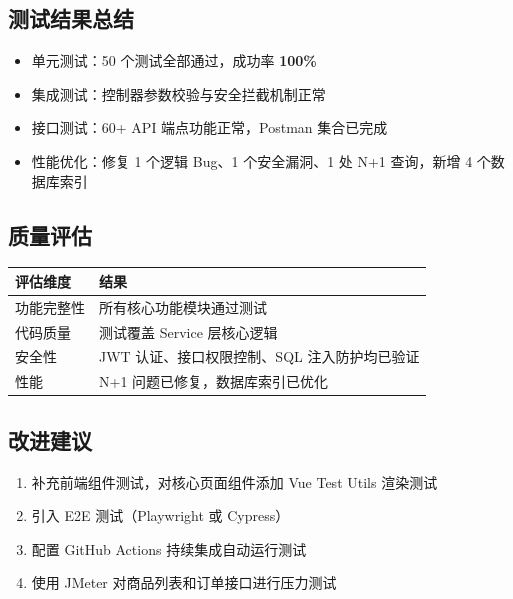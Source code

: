 \documentclass[12pt,a4paper,UTF8]{ctexart}
\begin{document}
\subsection{测试结果总结}
\begin{itemize}
    \item 单元测试：50 个测试全部通过，成功率 \textbf{100\%}
    \item 集成测试：控制器参数校验与安全拦截机制正常
    \item 接口测试：60+ API 端点功能正常，Postman 集合已完成
    \item 性能优化：修复 1 个逻辑 Bug、1 个安全漏洞、1 处 N+1 查询，新增 4 个数据库索引
\end{itemize}

\subsection{质量评估}

\begin{table}[H]
\centering
\begin{tabularx}{\textwidth}{lX}
\toprule
\textbf{评估维度} & \textbf{结果} \\
\midrule
功能完整性 & 所有核心功能模块通过测试 \\
代码质量 & 测试覆盖 Service 层核心逻辑 \\
安全性 & JWT 认证、接口权限控制、SQL 注入防护均已验证 \\
性能 & N+1 问题已修复，数据库索引已优化 \\
\bottomrule
\end{tabularx}
\end{table}

\subsection{改进建议}
\begin{enumerate}
    \item 补充前端组件测试，对核心页面组件添加 Vue Test Utils 渲染测试
    \item 引入 E2E 测试（Playwright 或 Cypress）
    \item 配置 GitHub Actions 持续集成自动运行测试
    \item 使用 JMeter 对商品列表和订单接口进行压力测试
\end{enumerate}
\end{document}
